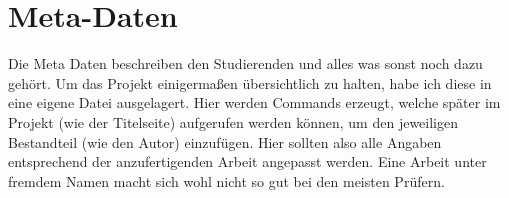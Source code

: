 \chapter{Meta-Daten}
Die Meta Daten beschreiben den Studierenden und alles was sonst noch dazu gehört. Um das Projekt einigermaßen übersichtlich zu halten, habe ich diese in eine eigene Datei ausgelagert. Hier werden Commands erzeugt, welche später im Projekt (wie der Titelseite) aufgerufen werden können, um den jeweiligen Bestandteil (wie den Autor) einzufügen. Hier sollten also alle Angaben entsprechend der anzufertigenden Arbeit angepasst werden. Eine Arbeit unter fremdem Namen macht sich wohl nicht so gut bei den meisten Prüfern.